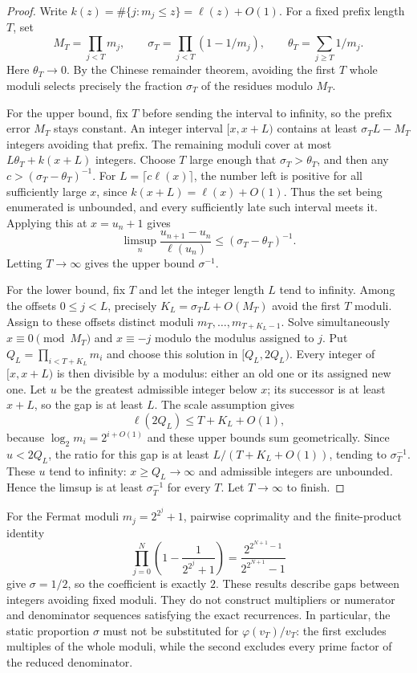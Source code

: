 \begin{proof}
Write $k(z)=\#\{j:m_j\le z\}=\ell(z)+O(1)$. For a fixed prefix length
$T$, set
\[
 M_T=\prod_{j<T}m_j,\qquad
 \sigma_T=\prod_{j<T}(1-1/m_j),\qquad
 \theta_T=\sum_{j\ge T}1/m_j.
\]
Here $\theta_T\to0$. By the Chinese remainder theorem, avoiding the first
$T$ whole moduli selects precisely the fraction $\sigma_T$ of the
residues modulo $M_T$.

For the upper bound, fix $T$ before sending the interval to infinity,
so the prefix error $M_T$ stays constant. An integer interval
$[x,x+L)$ contains at least
$\sigma_TL-M_T$ integers avoiding that prefix. The remaining moduli
cover at most $L\theta_T+k(x+L)$ integers. Choose $T$ large enough that
$\sigma_T>\theta_T$, and then any
$c>(\sigma_T-\theta_T)^{-1}$.
For $L=\lceil c\ell(x)\rceil$, the number left is positive for all
sufficiently large $x$, since $k(x+L)=\ell(x)+O(1)$.
Thus the set being enumerated is unbounded, and every sufficiently late
such interval meets it. Applying this at $x=u_n+1$ gives
\[
 \limsup_n\frac{u_{n+1}-u_n}{\ell(u_n)}
 \le(\sigma_T-\theta_T)^{-1}.
\]
Letting $T\to\infty$ gives the upper bound $\sigma^{-1}$.

For the lower bound, fix $T$ and let the integer length $L$ tend to
infinity. Among the offsets $0\le j<L$, precisely
$K_L=\sigma_TL+O(M_T)$ avoid the first $T$ moduli.
Assign to these offsets distinct moduli
$m_T,\ldots,m_{T+K_L-1}$. Solve simultaneously
$x\equiv0\pmod{M_T}$ and $x\equiv-j$ modulo the modulus assigned to $j$.
Put $Q_L=\prod_{i<T+K_L}m_i$ and choose this solution in $[Q_L,2Q_L)$.
Every integer of $[x,x+L)$ is then divisible by a modulus: either an old
one or its assigned new one. Let $u$ be the greatest admissible integer
below $x$; its successor is at least $x+L$, so the gap is at least $L$.
The scale assumption gives
\[
 \ell(2Q_L)\le T+K_L+O(1),
\]
because $\log_2m_i=2^{i+O(1)}$ and these upper bounds sum geometrically.
Since $u<2Q_L$, the ratio for this gap is at least
$L/(T+K_L+O(1))$, tending to $\sigma_T^{-1}$.
These $u$ tend to infinity: $x\ge Q_L\to\infty$ and admissible integers
are unbounded. Hence the limsup is at least $\sigma_T^{-1}$ for every
$T$. Let $T\to\infty$ to finish.
\end{proof}

For the Fermat moduli $m_j=2^{2^j}+1$, pairwise coprimality and the
finite-product identity
\[
 \prod_{j=0}^{N}\left(1-\frac1{2^{2^j}+1}\right)
 =\frac{2^{2^{N+1}-1}}{2^{2^{N+1}}-1}
\]
give $\sigma=1/2$, so the coefficient is exactly $2$.
These results describe gaps between integers avoiding fixed moduli.
They do not construct multipliers or numerator and denominator sequences
satisfying the exact recurrences. In particular, the static proportion
$\sigma$ must not be substituted for $\varphi(v_T)/v_T$: the first
excludes multiples of the whole moduli, while the second excludes every
prime factor of the reduced denominator.

